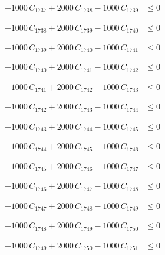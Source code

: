 \documentclass[a4paper,11pt]{article}
\begin{document}
\begin{align}
-1000\,C_{1737} + 2000\,C_{1738} - 1000\,C_{1739} &\leq 0 \nonumber
\end{align}

\begin{align}
-1000\,C_{1738} + 2000\,C_{1739} - 1000\,C_{1740} &\leq 0 \nonumber
\end{align}

\begin{align}
-1000\,C_{1739} + 2000\,C_{1740} - 1000\,C_{1741} &\leq 0 \nonumber
\end{align}

\begin{align}
-1000\,C_{1740} + 2000\,C_{1741} - 1000\,C_{1742} &\leq 0 \nonumber
\end{align}

\begin{align}
-1000\,C_{1741} + 2000\,C_{1742} - 1000\,C_{1743} &\leq 0 \nonumber
\end{align}

\begin{align}
-1000\,C_{1742} + 2000\,C_{1743} - 1000\,C_{1744} &\leq 0 \nonumber
\end{align}

\begin{align}
-1000\,C_{1743} + 2000\,C_{1744} - 1000\,C_{1745} &\leq 0 \nonumber
\end{align}

\begin{align}
-1000\,C_{1744} + 2000\,C_{1745} - 1000\,C_{1746} &\leq 0 \nonumber
\end{align}

\begin{align}
-1000\,C_{1745} + 2000\,C_{1746} - 1000\,C_{1747} &\leq 0 \nonumber
\end{align}

\begin{align}
-1000\,C_{1746} + 2000\,C_{1747} - 1000\,C_{1748} &\leq 0 \nonumber
\end{align}

\begin{align}
-1000\,C_{1747} + 2000\,C_{1748} - 1000\,C_{1749} &\leq 0 \nonumber
\end{align}

\begin{align}
-1000\,C_{1748} + 2000\,C_{1749} - 1000\,C_{1750} &\leq 0 \nonumber
\end{align}

\begin{align}
-1000\,C_{1749} + 2000\,C_{1750} - 1000\,C_{1751} &\leq 0 \nonumber
\end{align}
\end{document}
